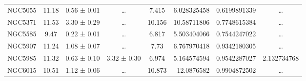 \documentclass[reprint,%
 amsmath,amssymb,
 aps,
]{revtex4-1}
\begin{document}
\begin{table}[]
\begin{tabular}{cccccrrc}
\rowcolor[HTML]{F3F3F3} 
NGC5055              & 11.18                     & 0.56 ± 0.01           & …                      & 7.415                                                        & 6.028325458                                                           & 0.6199891339                                                          & …                                                             \\
\rowcolor[HTML]{F3F3F3} 
NGC5371              & 11.53                     & 3.30 ± 0.29           & …                      & 10.156                                                       & 10.58711806                                                           & 0.7748615384                                                          & …                                                             \\
\rowcolor[HTML]{F3F3F3} 
NGC5585              & 9.47                      & 0.22 ± 0.01           & …                      & 6.817                                                        & 5.503404066                                                           & 0.7544247022                                                          & …                                                             \\
\rowcolor[HTML]{F3F3F3} 
NGC5907              & 11.24                     & 1.08 ± 0.07           & …                      & 7.73                                                         & 6.767970418                                                           & 0.9342180305                                                          & …                                                             \\
\rowcolor[HTML]{F3F3F3} 
NGC5985              & 11.32                     & 0.63 ± 0.10           & 3.32 ± 0.30            & 6.974                                                        & 5.164574594                                                           & 0.9542287027                                                          & \multicolumn{1}{r}{\cellcolor[HTML]{F3F3F3}2.132734768}       \\
\rowcolor[HTML]{F3F3F3} 
NGC6015              & 10.51                     & 1.12 ± 0.06           & …                      & 10.873                                                       & 12.0876582                                                            & 0.9904872502                                                          & …                                                             \\

\end{tabular}
\end{table}
\end{document}
